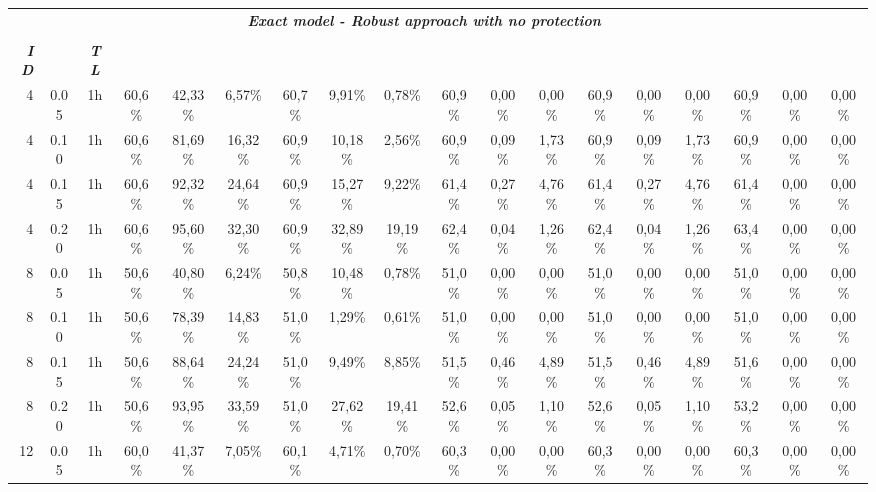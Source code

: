 \documentclass[final,5p,times,twocolumn]{elsarticle}
\begin{document}
\begin{table*}[!htb]
\centering
\tabcolsep 3.7pt
\scriptsize
\begin{tabular}{rccccccccccccccccc}
& & \multicolumn{14}{c}{\textbf{\textit{Exact model - Robust approach with no protection}}} \\
\cline{4-18}
& & & \multicolumn{3}{c}{\textbf{\textit{}}} & \multicolumn{3}{c}{\textbf{\textit{}}} &  \multicolumn{3}{c}{\textbf{\textit{}}} & \multicolumn{3}{c}{\textbf{\textit{}}} & \multicolumn{3}{c}{\textbf{\textit{}}} \\ 
\hline
\textbf{\textit{ID}} & \textbf{\textit{}} & \textbf{\textit{TL}} & \textbf{\textit{}} &  &	 & \textbf{\textit{}} &  &	 & \textbf{\textit{}} &  &	 & \textbf{\textit{}} &  &	 & \textbf{\textit{}} &  &	 \\ 
\hline
4 & 0.05 & 1h & 60,6\% & 42,33\% & 6,57\% & 60,7\% & 9,91\% & 0,78\% & 60,9\% & 0,00\% & 0,00\% & 60,9\% & 0,00\% & 0,00\% & 60,9\% & 0,00\% & 0,00\%    \\ 
4 & 0.10 & 1h & 60,6\% & 81,69\% & 16,32\% & 60,9\% & 10,18\% & 2,56\% & 60,9\% & 0,09\% & 1,73\% & 60,9\% & 0,09\% & 1,73\% & 60,9\% & 0,00\% & 0,00\%  \\ 
4 & 0.15 & 1h & 60,6\% & 92,32\% & 24,64\% & 60,9\% & 15,27\% & 9,22\% & 61,4\% & 0,27\% & 4,76\% & 61,4\% & 0,27\% & 4,76\% & 61,4\% & 0,00\% & 0,00\%  \\ 
4 & 0.20 & 1h & 60,6\% & 95,60\% & 32,30\% & 60,9\% & 32,89\% & 19,19\% & 62,4\% & 0,04\% & 1,26\% & 62,4\% & 0,04\% & 1,26\% & 63,4\% & 0,00\% & 0,00\% \\ 
8 & 0.05 & 1h & 50,6\% & 40,80\% &  6,24\% & 50,8\% & 10,48\% &  0,78\% & 51,0\% & 0,00\% & 0,00\% & 51,0\% & 0,00\% & 0,00\% & 51,0\% & 0,00\% & 0,00\% \\ 
8 & 0.10 & 1h & 50,6\% & 78,39\% & 14,83\% & 51,0\% & 1,29\% &  0,61\% & 51,0\% & 0,00\% & 0,00\% & 51,0\% & 0,00\% & 0,00\% & 51,0\% & 0,00\% & 0,00\%  \\ 
8 & 0.15 & 1h & 50,6\% & 88,64\% & 24,24\% & 51,0\% & 9,49\% &  8,85\% & 51,5\% & 0,46\% & 4,89\% & 51,5\% & 0,46\% & 4,89\% & 51,6\% & 0,00\% & 0,00\%  \\ 
8 & 0.20 & 1h & 50,6\% & 93,95\% & 33,59\% & 51,0\% & 27,62\% & 19,41\% & 52,6\% & 0,05\% & 1,10\% & 52,6\% & 0,05\% & 1,10\% & 53,2\% & 0,00\% & 0,00\% \\ 
12 & 0.05 & 1h & 60,0\% & 41,37\% &  7,05\% & 60,1\% & 4,71\% &  0,70\% & 60,3\% & 0,00\% & 0,00\% & 60,3\% & 0,00\% & 0,00\% & 60,3\% & 0,00\% & 0,00\% \\ 

\end{tabular}
\end{table*}
\end{document}

